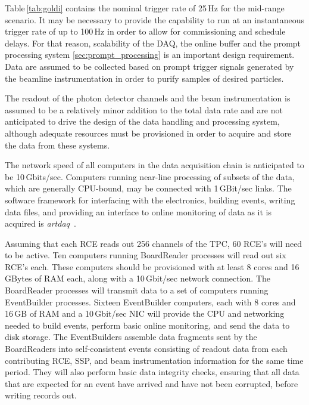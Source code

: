 

Table\,\ref{tab:goldi} contains the nominal trigger rate of 25\,Hz for
the mid-range scenario. It may be necessary to provide the capability
to run at  an instantaneous trigger rate of up to 100\,Hz in order to
allow for commissioning and schedule delays. For that reason,
scalability of the DAQ, the online buffer and the prompt processing system
\ref{sec:prompt_processing} is an important design requirement.
 Data are assumed to be
collected based on prompt trigger signals generated by the beamline
instrumentation in order to purify samples of desired particles.

The readout of the photon detector channels and the beam
instrumentation is assumed to be a relatively minor addition to the
total data rate and are not anticipated to drive the design of the
data handling and processing system, although adequate resources must
be provisioned in order to acquire and store the data from these
systems.

The network speed of all computers in the data acquisition
chain is anticipated to be 10\,Gbits/sec.  Computers running near-line
processing of subsets of the data, which are generally CPU-bound, may
be connected with 1\,GBit/sec links.  The software framework for
interfacing with the electronics, building events, writing data files,
and providing an interface to online monitoring of data as it is
acquired is {\it artdaq}~\cite{artdaq}.

Assuming that each RCE reads out 256 channels of the TPC, 60 RCE's
will need to be active.  Ten computers running BoardReader
processes will read out six RCE's each.  These computers should be
provisioned with at least 8 cores and 16 GBytes of RAM each, along
with a 10\,Gbit/sec network connection.  The BoardReader processes will
transmit data to a set of computers running EventBuilder processes.
Sixteen EventBuilder computers, each with 8 cores and 16\,GB of RAM
and a 10\,Gbit/sec NIC will provide the CPU and networking needed to
build events, perform basic online monitoring, and send the data to
disk storage.  The EventBuilders assemble data fragments sent by the
BoardReaders into self-consistent events consisting of readout data
from each contributing RCE, SSP, and beam instrumentation information
for the same time period.  They will also perform basic data integrity
checks, ensuring that all data that are expected for an event have
arrived and have not been corrupted, before writing records out.

